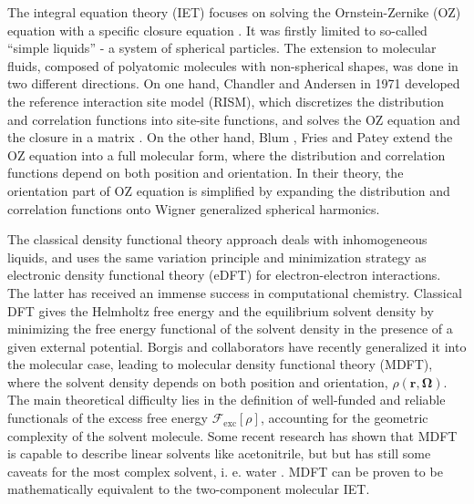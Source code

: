 The integral equation theory (\acs{IET}) focuses on solving the Ornstein-Zernike
(\acs{OZ}) equation with a specific closure equation \citep{Hensen-McDonald,Gray-Gubbins}.
It was firstly limited to so-called ``simple liquids'' - a system
of spherical particles. The extension to molecular fluids, composed
of polyatomic molecules with non-spherical shapes, was done in two
different directions. On one hand, Chandler and Andersen in 1971 \citep{Chandler_1972_RISM}
developed the reference interaction site model (\acs{RISM}), which
discretizes the distribution and correlation functions into site-site
functions, and solves the \acs{OZ} equation and the closure in a
matrix \citep{hirata_molecular_2004}. On the other hand, Blum \citep{Blum_I,Blum_II},
Fries and Patey \citep{Fries_Patey_1985} extend the \acs{OZ} equation
into a full molecular form, where the distribution and correlation
functions depend on both position and orientation. In their theory,
the orientation part of \acs{OZ} equation is simplified by expanding
the distribution and correlation functions onto Wigner generalized
spherical harmonics.

The classical density functional theory approach deals with inhomogeneous
liquids, and uses the same variation principle and minimization strategy
\citep{mermin_thermal_1965,Evans_1979,Hansen_1987} as electronic
density functional theory (e\acs{DFT}) for electron-electron interactions.
The latter has received an immense success in computational chemistry.
Classical \acs{DFT} gives the Helmholtz free energy and the equilibrium
solvent density by minimizing the free energy functional of the solvent
density in the presence of a given external potential. Borgis and
collaborators \citep{gendre_classical_2009,jeanmairet_molecular_2013-1,jeanmairet_molecular_2015,jeanmairet_molecular_2016,Jeanmairet_thesis,levesque_solvation_2012,ramirez_density_2002,ramirez_density_2005,sergiievskyi_fast_2014,Zhao_2011}
have recently generalized it into the molecular case, leading to molecular
density functional theory (\acs{MDFT}), where the solvent density
depends on both position and orientation, $\rho(\mathbf{r},\mathbf{\Omega})$.
The main theoretical difficulty lies in the definition of well-funded
and reliable functionals of the excess free energy $\mathcal{F}_{\mathrm{exc}}\left[\rho\right]$,
accounting for the geometric complexity of the solvent molecule. Some
recent research has shown that \acs{MDFT} is capable to describe
linear solvents like acetonitrile, but but has still some caveats
for the most complex solvent, i. e. water \citep{Zhao_2011}. \acs{MDFT}
can be proven to be mathematically equivalent to the two-component
molecular \acs{IET}.

